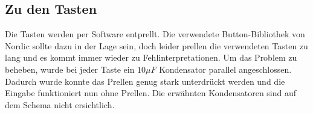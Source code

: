 \subsection{Zu den Tasten}
    Die Tasten werden per Software entprellt. 
    Die verwendete Button-Bibliothek von Nordic sollte dazu in der Lage sein, doch leider prellen die verwendeten Tasten zu lang und es kommt immer wieder zu Fehlinterpretationen. 
    Um das Problem zu beheben, wurde bei jeder Taste ein \(10\mu F\) Kondensator parallel angeschlossen. Dadurch wurde konnte das Prellen genug stark unterdrückt werden und die Eingabe funktioniert nun ohne Prellen.
    Die erwähnten Kondensatoren sind auf dem Schema nicht ersichtlich.
    
   
\newpage
  